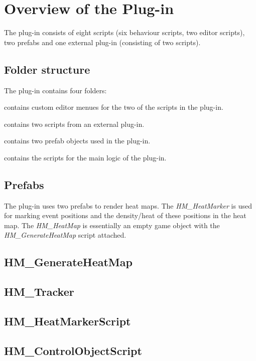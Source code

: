 \section{Overview of the Plug-in}
\label{CO}
The plug-in consists of eight scripts (six behaviour scripts, two editor scripts), two prefabs and one external plug-in (consisting of two scripts). 

\subsection{Folder structure}
\label{CO_FStructure}
The plug-in contains four folders:
\begin{my_enumerate}
\item [\textit{Editor}] contains custom editor menues for the two of the scripts in the plug-in.
\item [\textit{Plugins}] contains two scripts from an external plug-in.
\item [\textit{Prefabs}] contains two prefab objects used in the plug-in.
\item [\textit{Scripts}] contains the scripts for the main logic of the plug-in.
\end{my_enumerate}

\subsection{Prefabs}
\label{CO_Prefabs}
The plug-in uses two prefabs to render heat maps. The \textit{HM\_HeatMarker} is used for marking event positions and the density/heat of these positions in the heat map. The \textit{HM\_HeatMap} is essentially an empty game object with the \textit{HM\_GenerateHeatMap} script attached.

\subsection{HM\_GenerateHeatMap}
\label{CO_GHM}

\subsection{HM\_Tracker}
\label{CO_Tracker}

\subsection{HM\_HeatMarkerScript}
\label{CO_HMS}

\subsection{HM\_ControlObjectScript}
\label{CO_COS}


